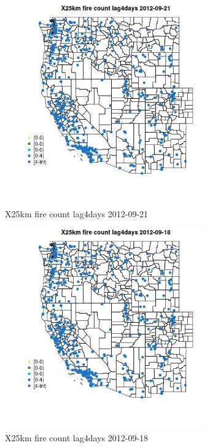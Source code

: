 \begin{figure} 
\centering  
\includegraphics[width=0.77\textwidth]{Code_Outputs/Report_ML_input_PM25_Step4_part_e_de_duplicated_aves_compiled_2019-05-14wNAs_MapObsX25km_fire_count_lag4days2012-09-21.jpg} 
\caption{\label{fig:Report_ML_input_PM25_Step4_part_e_de_duplicated_aves_compiled_2019-05-14wNAsMapObsX25km_fire_count_lag4days2012-09-21}X25km fire count lag4days 2012-09-21} 
\end{figure} 
 

\clearpage 

\begin{figure} 
\centering  
\includegraphics[width=0.77\textwidth]{Code_Outputs/Report_ML_input_PM25_Step4_part_e_de_duplicated_aves_compiled_2019-05-14wNAs_MapObsX25km_fire_count_lag4days2012-09-18.jpg} 
\caption{\label{fig:Report_ML_input_PM25_Step4_part_e_de_duplicated_aves_compiled_2019-05-14wNAsMapObsX25km_fire_count_lag4days2012-09-18}X25km fire count lag4days 2012-09-18} 
\end{figure} 
 

